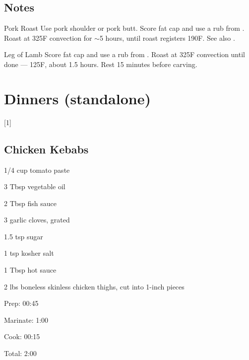 \documentclass[oneside]{book}  %
\def\thisrecipe{}  %
\newcommand{\chapterrec}[1]{  %
  \newpage \def\thisrecipe{} \chapter{#1} \vspace{1.1em}
}
\newcommand{\chaptertoc}[1]{  %
  \chapterrec{#1} \vspace{-1.1em}  %
  \startcontents[chapters] \printcontents[chapters]{chapter_toc_}{1}[1]{}
}
\newcommand{\recipe}[1]{\section{#1}\def\thisrecipe{: #1}} %
\newcommand{\degF}{\textdegree F\xspace}
\newcommand{\about}{$\sim$}
\begin{document}
\recipe{Notes} \label{notes:dinners_leftovers} %
\begin{kitchennotes}
  \item[Pork Roast]  
    Use pork shoulder or pork butt. Score fat cap and use a rub from
    . Roast at 325\degF convection for
    \about 5 hours, until roast registers 190\degF. See also \CICookbook[418].
  \item[Leg of Lamb]  
    Score fat cap and use a rub from . Roast
    at 325\degF convection until done --- 125\degF, about 1.5 hours. Rest 15
    minutes before carving.
\end{kitchennotes}

\chaptertoc{Dinners (standalone)} \label{chap:dinners_standalone}
\recipe{Chicken Kebabs} \label{recipe:chicken_kebabs} %

\begin{IT}[0.813]
  \begin{ingredients}[serves=4]
    \item[1/4 cup] tomato paste
    \item[3 Tbsp] vegetable oil
    \item[2 Tbsp] fish sauce
    \item[3] garlic cloves, grated
    \item[1.5 tsp] sugar
    \item[1 tsp] kosher salt
    \item[1 Tbsp] hot sauce
    \item[2 lbs] boneless skinless chicken thighs, cut into 1-inch pieces
  \end{ingredients}

  \switchcolumn

  \begin{timeline}
    \item[Prep:]     00:45
    \item[Marinate:] 1:00
    \item[Cook:]     00:15
    \item[Total:]    2:00
  \end{timeline}
\end{IT}
\end{document}
